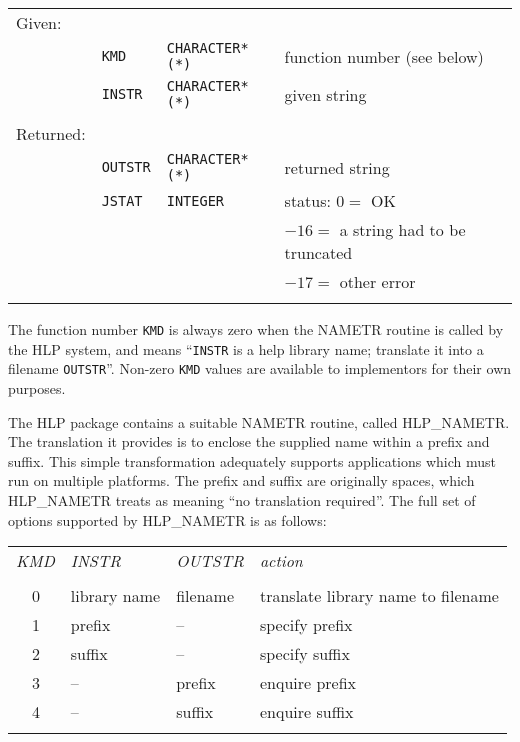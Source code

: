 \documentclass[11pt,nolof]{starlink}
\begin{document}
\begin{tabular}{llll}
\\
Given: \\
& \texttt{KMD} & \texttt{CHARACTER*(*)} & function number (see below) \\
& \texttt{INSTR} & \texttt{CHARACTER*(*)} & given string \\ \\
Returned: \\
& \texttt{OUTSTR} & \texttt{CHARACTER*(*)} & returned string \\
& \texttt{JSTAT} & \texttt{INTEGER} & status:  $0=$ OK \\
& & & \hspace{1.7em}         $-16=$ a string had to be truncated \\
& & & \hspace{1.7em}         $-17=$ other error \\ \\
\end{tabular}

The function number \texttt{KMD} is always zero when the NAMETR routine
is called by the HLP system, and means ``\texttt{INSTR} is a help
library name; translate it into a filename \texttt{OUTSTR}''.  Non-zero
\texttt{KMD} values are available to implementors for their own
purposes.

The HLP package contains a suitable NAMETR routine, called
HLP\_NAMETR.  The translation it provides is to
enclose the supplied name within a prefix and suffix.  This
simple transformation adequately supports applications
which must run on multiple platforms.
The prefix and
suffix are originally spaces, which HLP\_NAMETR treats as meaning
``no translation required''.  The full set of options supported by
HLP\_NAMETR is as follows:

\begin{tabular}{llll}
\\
\textit{KMD} & \textit{INSTR} & \textit{OUTSTR} & \textit{action} \\ \\
~~0 & library name & filename & translate library name to filename \\
~~1 & prefix & -- & specify prefix \\
~~2 & suffix & -- & specify suffix \\
~~3 & -- & prefix & enquire prefix \\
~~4 & -- & suffix & enquire suffix \\ \\
\end{tabular}
\end{document}
